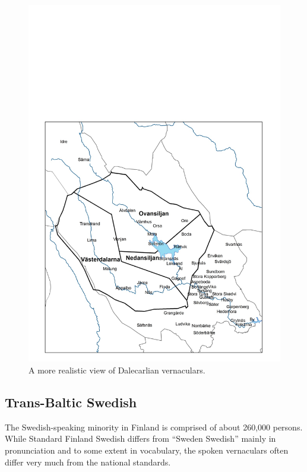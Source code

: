 \begin{figure}[h]

\includegraphics{figures_mod/image7}
\caption{A more realistic view of Dalecarlian vernaculars.}
\label{map:7}

\end{figure}

\subsection{ Trans-Baltic Swedish}

The Swedish-speaking minority in Finland is comprised of about 260,000 persons. While Standard Finland Swedish differs from “Sweden Swedish” mainly in pronunciation and to some extent in vocabulary, the spoken vernaculars often differ very much from the national standards. 

